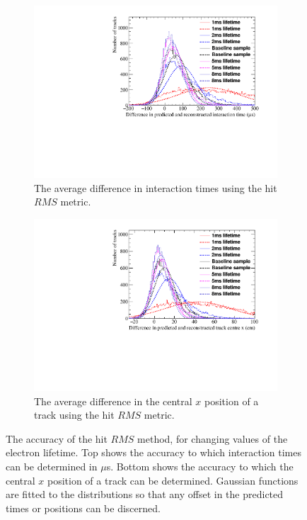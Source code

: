 \begin{figure}[h!]
  \centering
  \begin{subfigure}{0.6\textwidth}
    \centering
    \includegraphics[width=\textwidth]{Canvas_AvDiff_T_RMS_ElecLifetime}
    \caption{The average difference in interaction times using the hit $RMS$ metric.}
    \label{fig:DiffLifeStudy_AvDiffRMS_T}
  \end{subfigure}
  \begin{subfigure}{0.6\textwidth}
    \centering
    \includegraphics[width=\textwidth]{Canvas_AvDiff_X_RMS_ElecLifetime}
    \caption{The average difference in the central $x$ position of a track using the hit $RMS$ metric.}
    \label{fig:DiffLifeStudy_AvDiffRMS_X}
  \end{subfigure}
  \caption[Comparing the accuracy of the hit $RMS$ method, as the electron lifetime changes]
          {The accuracy of the hit $RMS$ method, for changing values of the electron lifetime. Top shows the accuracy to which interaction times can be determined in $\mu$s. Bottom shows the accuracy to which the central $x$ position of a track can be determined. Gaussian functions are fitted to the distributions so that any offset in the predicted times or positions can be discerned.}
  \label{fig:DiffLifeStudy_AvDiff_RMS}
\end{figure}

